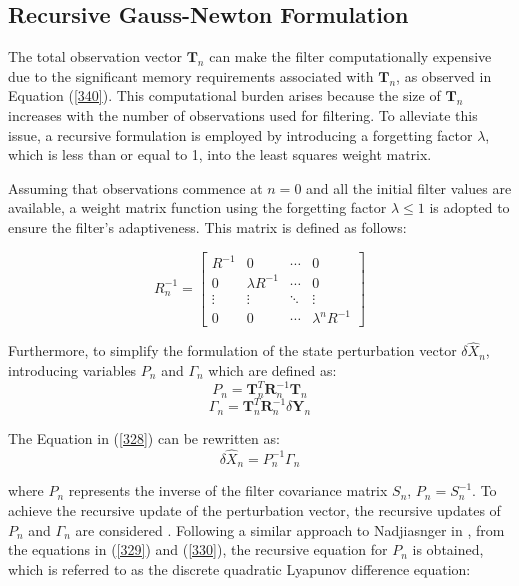 \subsection{Recursive Gauss-Newton Formulation}
The total observation vector \( \mathbf{T}_n \) can make the filter computationally expensive due to the significant memory requirements associated with \( \mathbf{T}_n \), as observed in Equation (\ref{340}). This computational burden arises because the size of \( \mathbf{T}_n \) increases with the number of observations used for filtering. To alleviate this issue, a recursive formulation is employed by introducing a forgetting factor \( \lambda \), which is less than or equal to 1, into the least squares weight matrix.

Assuming that observations commence at \(n=0\) and all the initial filter values are available, a weight matrix function using the forgetting factor \( \lambda \le 1 \) is adopted to ensure the filter's adaptiveness. This matrix is defined as follows:

\begin{equation}
    R_n^{-1} = 
    \begin{bmatrix}
        R^{-1} & 0 & \cdots & 0 \\
        0 & \lambda R^{-1} & \cdots & 0 \\
        \vdots & \vdots & \ddots & \vdots \\
        0 & 0 & \cdots & \lambda^n R^{-1}
    \end{bmatrix}
    \label{329}
\end{equation}

Furthermore, to simplify the formulation of the state perturbation vector \(\delta \hat{X}_n\), introducing variables \(P_n\) and \(\Gamma_n\) which are defined as: 
\begin{equation}
    P_n = \mathbf{T}^T_n \mathbf{R}_n^{-1} \mathbf{T}_n
    \label{330}
\end{equation}
\begin{equation}
    \Gamma_n = \mathbf{T}^T_n \mathbf{R}_n^{-1} \delta \mathbf{Y}_n
\end{equation}

The Equation in (\ref{328}) can be rewritten as:
\begin{equation}
    \delta \hat{X}_n = P^{-1}_n \Gamma_n
\end{equation}

where \(P_n\) represents the inverse of the filter covariance matrix \(S_n\), \(P_n = S_n^{-1}\). To achieve the recursive update of the perturbation vector, the recursive updates of \(P_n\) and \(\Gamma_n\) are considered \cite{Inggs1}. Following a similar approach to Nadjiasnger in \cite{Inggs1}, from the equations in (\ref{329}) and (\ref{330}), the recursive equation for \(P_n\) is obtained, which is referred to as the discrete quadratic Lyapunov difference equation:

